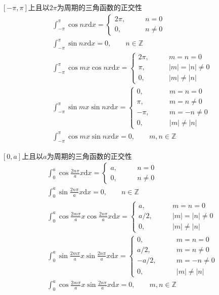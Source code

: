 \documentclass[lang = cn, scheme = chinese, thmcnt = section]{elegantbook}
\newcommand{\Z}{\mathbb{Z}}            %
\newcommand{\dd}{\mathrm{d}}           %
\begin{document}
\begin{theorem}{$[-\pi,\pi]$上且以$2\pi$为周期的三角函数的正交性}
	\begin{align*}
		& \int_{-\pi}^{\pi}\cos nx\dd x=\begin{cases}
			2\pi,\qquad & n=0\\
			0,\qquad & n\ne 0
		\end{cases}\\
		& \int_{-\pi}^{\pi}\sin nx\dd x=0,\qquad n\in\Z\\
		& \int_{-\pi}^{\pi}\cos mx\cos nx \dd x=\begin{cases}
			2\pi,\qquad & m=n=0\\
			\pi,\qquad & |m|=|n|\ne 0\\
			0,\qquad & |m|\ne |n|
		\end{cases}\\
		& \int_{-\pi}^{\pi}\sin mx\sin nx \dd x=\begin{cases}
			0,\qquad & m=n=0\\
			\pi,\qquad & m=n\ne 0\\
			-\pi,\qquad & m=-n\ne 0\\
			0,\qquad & |m|\ne |n|
		\end{cases}\\
		& \int_{-\pi}^{\pi}\cos mx\sin nx\dd x=0,\qquad m,n\in\Z
	\end{align*}
\end{theorem}

\begin{theorem}{$[0,a]$上且以$a$为周期的三角函数的正交性}
	\begin{align*}
		& \int_{0}^{a}\cos \frac{2n\pi}{a}x\dd x=\begin{cases}
			a,\qquad & n=0\\
			0,\qquad & n\ne 0
		\end{cases}\\
		& \int_{0}^{a}\sin \frac{2n\pi}{a}x\dd x=0,\qquad n\in\Z\\
		& \int_{0}^{a}\cos \frac{2m\pi}{a}x\cos \frac{2n\pi}{a}x \dd x=\begin{cases}
			a,\qquad & m=n=0\\
			a/2,\qquad & |m|=|n|\ne 0\\
			0,\qquad & |m|\ne |n|
		\end{cases}\\
		& \int_{0}^{a}\sin \frac{2m\pi}{a}x\sin \frac{2n\pi}{a}x \dd x=\begin{cases}
			0,\qquad & m=n=0\\
			a/2,\qquad & m=n\ne 0\\
			-a/2,\qquad & m=-n\ne 0\\
			0,\qquad & |m|\ne |n|
		\end{cases}\\
		& \int_{0}^{a}\cos \frac{2m\pi}{a}x\sin \frac{2n\pi}{a}x\dd x=0,\qquad m,n\in\Z
	\end{align*}
\end{theorem}
\end{document}
